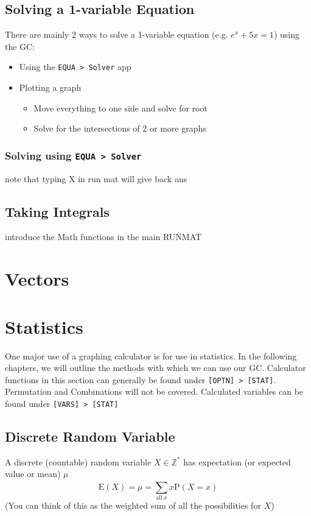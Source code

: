 \documentclass[a5paper]{memoir}
\def\code#1{\texttt{#1}}
\begin{document}
\section{Solving a 1-variable Equation}
There are mainly 2 ways to solve a 1-variable equation (e.g. $e^x + 5x = 1$) using the GC:
\begin{itemize}
	\item Using the \code{EQUA > Solver} app
	\item Plotting a graph
	\begin{itemize}
		\item Move everything to one side and solve for root
		\item Solve for the intersections of 2 or more graphs
	\end{itemize}
\end{itemize}

\subsection{Solving using \code{EQUA > Solver}}

note that typing X in run mat will give back ans

\section{Taking Integrals}
introduce the Math functions in the main RUNMAT

\chapter{Vectors} \label{vectors}

\chapter{Statistics}
One major use of a graphing calculator is for use in statistics. In the following chapters, we will outline the methods with which we can use our GC. Calculator functions in this section can generally be found under \code{[OPTN] > [STAT]}. Permutation and Combinations will not be covered. Calculated variables can be found under \code{[VARS] > [STAT]}

\section{Discrete Random Variable}
A discrete (countable) random variable $X \in \mathbb{Z}^*$ has expectation (or expected value or mean) $\mu$
\begin{equation}
	\mathrm{E}(X)=\mu=\sum_{\mathrm{all}~x}^{}x\mathrm{P}(X=x)
\end{equation}
(You can think of this as the weighted sum of all the possibilities for $X$)
\end{document}
